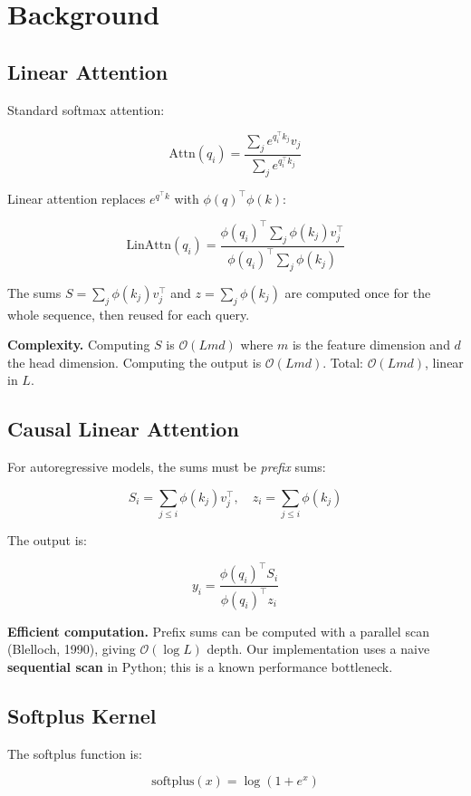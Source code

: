 
\section{Background}

\subsection{Linear Attention}

Standard softmax attention:

\[
\text{Attn}(q_i) = \frac{\sum_j e^{q_i^\top k_j} v_j}{\sum_j e^{q_i^\top k_j}}
\tag{3.1}
\]

Linear attention replaces $e^{q^\top k}$ with $\phi(q)^\top \phi(k)$:

\[
\text{LinAttn}(q_i) = \frac{\phi(q_i)^\top \sum_j \phi(k_j) v_j^\top}{\phi(q_i)^\top \sum_j \phi(k_j)}
\tag{3.2}
\]

The sums $S = \sum_j \phi(k_j) v_j^\top$ and $z = \sum_j \phi(k_j)$ are 
computed once for the whole sequence, then reused for each query.

\textbf{Complexity.} Computing $S$ is $\mathcal{O}(L m d)$ where $m$ is the 
feature dimension and $d$ the head dimension. Computing the output is 
$\mathcal{O}(L m d)$. Total: $\mathcal{O}(L m d)$, linear in $L$.

\subsection{Causal Linear Attention}

For autoregressive models, the sums must be \textit{prefix} sums:

\[
S_i = \sum_{j \le i} \phi(k_j) v_j^\top, \quad
z_i = \sum_{j \le i} \phi(k_j)
\tag{3.3}
\]

The output is:

\[
y_i = \frac{\phi(q_i)^\top S_i}{\phi(q_i)^\top z_i}
\tag{3.4}
\]

\textbf{Efficient computation.} Prefix sums can be computed with a parallel 
scan (Blelloch, 1990), giving $\mathcal{O}(\log L)$ depth. Our implementation 
uses a naive \textbf{sequential scan} in Python; this is a known performance 
bottleneck.

\subsection{Softplus Kernel}

The softplus function is:

\[
\text{softplus}(x) = \log(1 + e^x)
\tag{3.5}
\]

